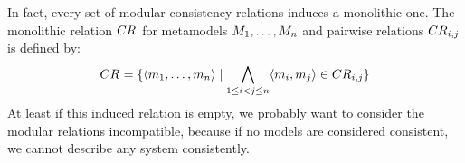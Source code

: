 In fact, every set of modular consistency relations induces a monolithic one.
The monolithic relation $\consistencyrelation{CR}{}$ for metamodels $\metamodelsequence{M}{n}$ and pairwise relations $\consistencyrelation{CR}{i,j}$ is defined by:
\begin{align*}
    \consistencyrelation{CR}{} = \setted{\tupled{\model{m}{1}, \dots, \model{m}{n}} \mid \bigwedge\limits_{1 \le i < j \le n} \tupled{\model{m}{i}, \model{m}{j}} \in \consistencyrelation{CR}{i,j}}
\end{align*}
At least if this induced relation is empty, we probably want to consider the modular relations incompatible, because if no models are considered consistent, we cannot describe any system consistently.





